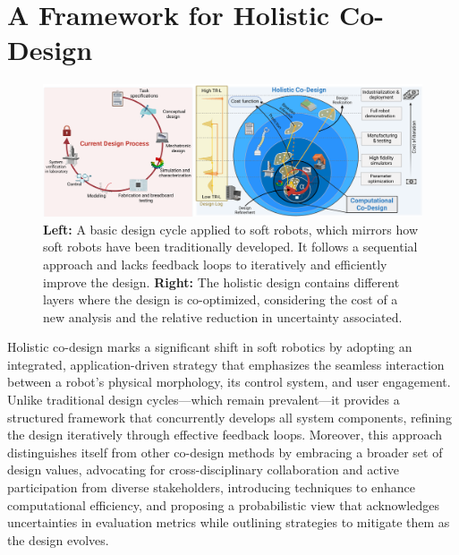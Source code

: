 \section{A Framework for Holistic Co-Design}\label{sec:apx:holisticcodesign:holistic_co_design_framework}
\begin{figure}[h!]
    \centering
    \includegraphics[width=1\linewidth]{appendix-holistic-codesign/figures/current_design_vs_holistic_codesign_v1.pdf}
    \caption{
        \textbf{Left:} A basic design cycle applied to soft robots, which mirrors how soft robots have been traditionally developed. It follows a sequential approach and lacks feedback loops to iteratively and efficiently improve the design.
        \textbf{Right:} The holistic design contains different layers where the design is co-optimized, considering the cost of a new analysis and the relative reduction in uncertainty associated.
    }
    \label{fig:apx:holisticcodesign:current_design_vs_holistic_codesign}
\end{figure}

Holistic co-design marks a significant shift in soft robotics by adopting an integrated, application-driven strategy that emphasizes the seamless interaction between a robot’s physical morphology, its control system, and user engagement. Unlike traditional design cycles—which remain prevalent—it provides a structured framework that concurrently develops all system components, refining the design iteratively through effective feedback loops. Moreover, this approach distinguishes itself from other co-design methods by embracing a broader set of design values, advocating for cross-disciplinary collaboration and active participation from diverse stakeholders, introducing techniques to enhance computational efficiency, and proposing a probabilistic view that acknowledges uncertainties in evaluation metrics while outlining strategies to mitigate them as the design evolves.

